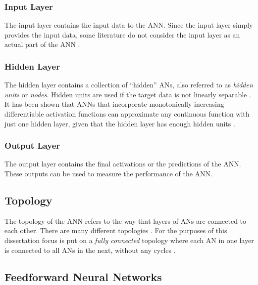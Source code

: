 \subsubsection{Input Layer}\label{sec:anns:anns:architecture:input}

The input layer contains the input data to the \acs{ANN}. Since the input layer simply provides the input data, some literature do not consider the input layer as an actual part of the \acs{ANN} \cite{ref:engelbrecht:2007}.

\subsubsection{Hidden Layer}\label{sec:anns:anns:architecture:hidden}

The hidden layer contains a collection of ``hidden'' \acp{AN}, also referred to as \textit{hidden units} or \textit{nodes}. Hidden units are used if the target data is not linearly separable \cite{ref:engelbrecht:2007}. It has been shown that \acp{ANN} that incorporate monotonically increasing differentiable activation functions can approximate any continuous function with just one hidden layer, given that the hidden layer has enough hidden units \cite{ref:hornik:1989}.

\subsubsection{Output Layer}\label{sec:anns:anns:architecture:output}

The output layer contains the final activations or the predictions of the \acs{ANN}. These outputs can be used to measure the performance of the \acs{ANN}.


\subsection{Topology}
\label{sec:anns:anns:topology}

The topology of the \acs{ANN} refers to the way that layers of \acp{AN} are connected to each other. There are many different topologies \cite{ref:miikkulainen:2010}. For the purposes of this dissertation focus is put on a \textit{fully connected} topology where each \acs{AN} in one layer is connected to all \acp{AN} in the next, without any cycles \cite{ref:zell:1994}.


\subsection{Feedforward Neural Networks}\label{sec:anns:anns:ffnns}

